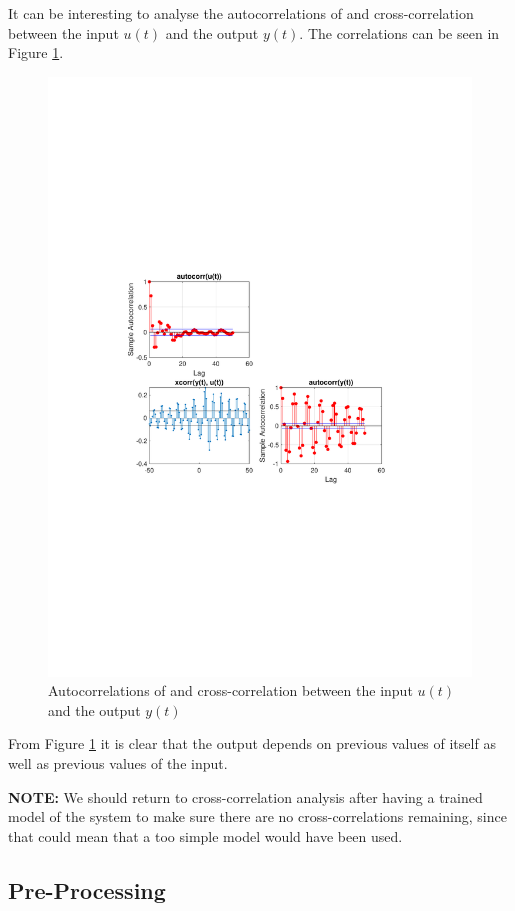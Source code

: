 \documentclass[]{article}
\begin{document}
It can be interesting to analyse the autocorrelations of and cross-correlation between the input $u(t)$ and the output $y(t)$. The correlations can be seen in Figure \ref{fig:cross-correlation}.
\begin{figure}[ht]
\centering
\includegraphics[trim= 10cm 8cm 10cm 8cm, scale=0.7]{figures/cross-correlation.pdf}
\caption{Autocorrelations of and cross-correlation between the input $u(t)$ and the output $y(t)$}
\label{fig:cross-correlation}
\end{figure}
From Figure \ref{fig:cross-correlation} it is clear that the output depends on previous values of itself as well as previous values of the input. 

\textbf{NOTE:} We should return to cross-correlation analysis after having a trained model of the system to make sure there are no cross-correlations remaining, since that could mean that a too simple model would have been used.

\subsection{Pre-Processing}
\end{document}
